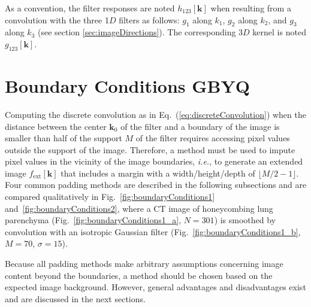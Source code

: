 \documentclass[fleqn,a4paper,oneside,openany]{book}
\newcommand\id[1]{{\hfill\normalsize{\idfont #1}}}
\begin{document}
As a convention, the filter responses are noted $h_{123}[\boldsymbol{k}]$ when resulting from a convolution with the three 1$D$ filters as follows: $g_1$ along $k_1$, $g_2$ along $k_2$, and $g_3$ along $k_3$ (see section \ref{sec:imageDirections}).
The corresponding 3$D$ kernel is noted $g_{123}[\boldsymbol{k}]$.


\section[Boundary Conditions]{Boundary Conditions \id{GBYQ}}\label{sec:boundaryConditions}
%
Computing the discrete convolution as in Eq.~(\ref{eq:discreteConvolution}) when the distance between the center $\boldsymbol{k}_0$ of the filter and a boundary of the image is smaller than half of the support $M$ of the filter requires accessing pixel values outside the support of the image.
Therefore, a method must be used to impute pixel values in the vicinity of the image boundaries, \emph{i.e.}, to generate an extended image $f_{\text{ext}}[\boldsymbol{k}]$ that includes a margin with a width/height/depth of $\lfloor M/2-1 \rfloor$.
Four common padding methods are described in the following subsections and are compared qualitatively in Fig.~\ref{fig:boundaryConditions1} and~\ref{fig:boundaryConditions2}, where a CT image of honeycombing lung parenchyma (Fig.~\ref{fig:boundaryConditions1_a}, $N=301$) is smoothed by convolution with an isotropic Gaussian filter (Fig.~\ref{fig:boundaryConditions1_b}, $M=70$, $\sigma = 15$).

Because all padding methods make arbitrary assumptions concerning image content beyond the boundaries, a method should be chosen based on the expected image background.
However, general advantages and disadvantages exist and are discussed in the next sections.
\end{document}
